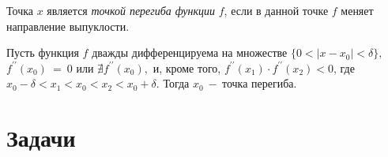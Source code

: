 \documentclass[10pt]{article}
\begin{document}



\begin{definition}
 Точка $x$ является \emph{точкой перегиба функции} \emph{$f$}, если в данной точке $f$ меняет направление выпуклости.
\end{definition}

\begin{proposition}
Пусть функция $f$ дважды дифференцируема на множестве
$\{0<|x-x_0|<\delta\},\,$ $f^{\prime \prime}(x_0)~=~0$ или $\nexists f^{\prime \prime}(x_0),$ и, кроме того,
$f^{\prime \prime}(x_1) \cdot f^{\prime \prime}(x_2)<0$, где $x_0 - \delta < x_1 < x_0 < x_2 < x_0 + \delta.$ Тогда $x_0 ~-~\text{точка перегиба}$.
\end{proposition}

\section[Задачи]{Задачи}\label{sec:problems_26}



\end{document}

